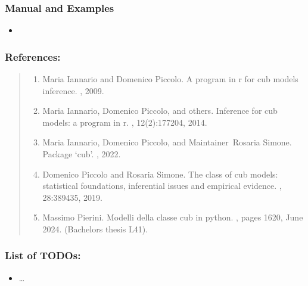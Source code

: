 \documentclass[letterpaper,10pt,english]{sphinxmanual}
\begin{document}
\subsubsection{Manual and Examples}
\label{\detokenize{cubmods:id549}}\begin{itemize}
\item {} 
\sphinxAtStartPar
{}

\end{itemize}


\subsubsection{References:}
\label{\detokenize{cubmods:id550}}\begin{quote}
\begin{enumerate}
%
\setcounter{enumi}{0}
\item {} 
\sphinxAtStartPar
Maria Iannario and Domenico Piccolo. A program in r for cub models inference. , 2009.

\item {} 
\sphinxAtStartPar
Maria Iannario, Domenico Piccolo, and others. Inference for cub models: a program in r. , 12(2):177\textendash{}204, 2014.

\item {} 
\sphinxAtStartPar
Maria Iannario, Domenico Piccolo, and Maintainer Rosaria Simone. Package ‘cub’. , 2022.

\item {} 
\sphinxAtStartPar
Domenico Piccolo and Rosaria Simone. The class of cub models: statistical foundations, inferential issues and empirical evidence. , 28:389\textendash{}435, 2019.

\item {} 
\sphinxAtStartPar
Massimo Pierini. Modelli della classe cub in python. , pages 16\textendash{}20, June 2024. (Bachelor\textquotesingle{}s thesis L\sphinxhyphen{}41).

\end{enumerate}
\end{quote}


\subsubsection{List of TODOs:}
\label{\detokenize{cubmods:id588}}\begin{itemize}
\item {} 
\sphinxAtStartPar
…

\end{itemize}
\end{document}

